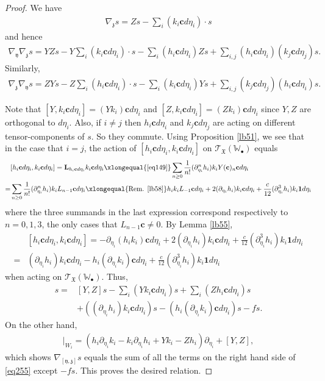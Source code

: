 \documentclass[12pt,b5paper,notitlepage]{report}
\theoremstyle{definition}
\theoremstyle{plain}
\newcommand{\fk}{\mathfrak}
\newcommand{\wtd}{\widetilde}
\newcommand{\id}{\mathbf{1}}
\newcommand{\scr}{\mathscr}
\newcommand{\yk}{\mathfrak y}
\newcommand{\zk}{\mathfrak z}
\newcommand{\mbf}{\mathbf}
\newcommand{\blt}{\bullet}
\newcommand{\Wbb}{\mathbb W}
\newcommand{\cbf}{\mathbf c}
\numberwithin{equation}{section}
\begin{document}
\begin{proof}
We have
\begin{align*}
\nabla_\zk s=Zs-\sum_i (k_i\cbf d\eta_i)\cdot s
\end{align*}
and hence
\begin{align*}
\nabla_\yk\nabla_\zk s=YZs-Y\sum_i (k_i\cbf d\eta_i)\cdot s-\sum_i(h_i\cbf d\eta_i) Zs+\sum_{i,j} (h_i\cbf d\eta_i)(k_j\cbf d\eta_j) s.
\end{align*}
Similarly,
\begin{align*}
\nabla_\zk\nabla_\yk s=ZYs-Z\sum_i (h_i\cbf d\eta_i)\cdot s-\sum_i(k_i\cbf d\eta_i) Ys+\sum_{i,j} (k_j\cbf d\eta_j)(h_i\cbf d\eta_i) s.
\end{align*}

Note that $[Y,k_i\cbf d\eta_i]=(Yk_i)\cbf d\eta_i$ and $[Z,k_i\cbf d\eta_i]=(Zk_i)\cbf d\eta_i$ since $Y,Z$ are orthogonal to $d\eta_i$. Also, if $i\neq j$ then $h_i\cbf d\eta_i$ and $k_j\cbf d\eta_j$ are acting on different tensor-components of $s$. So they commute. Using Proposition \ref{lb51}, we see that in the case that $i=j$, the action of $[h_i\cbf d\eta_i,k_i\cbf d\eta_i]$ on $\scr T_{\fk X}(\Wbb_\blt)$ equals
\begin{align*}
&[h_i\cbf d\eta_i,k_i\cbf d\eta_i]=\mbf L_{h_i\cbf d\eta_i}k_i\cbf d\eta_i \xlongequal{\eqref{eq149}} \sum_{n\geq 0}\frac 1{n!}(\partial_{\eta_i}^nh_i)k_i Y(\cbf)_n\cbf d\eta_i\\
=&\sum_{n\geq 0}\frac 1{n!}(\partial_{\eta_i}^nh_i) k_i L_{n-1}\cbf d\eta_i \xlongequal{\text{Rem. }\ref{lb58}} h_ik_i L_{-1}\cbf d\eta_i+ 2(\partial_{\eta_i}h_i)k_i\cbf d\eta_i+\frac c{12} (\partial_{\eta_i}^3h_i)k_i\id d\eta_i
\end{align*}
where the three summands in the last expression correspond respectively to $n=0,1,3$, the only cases that $L_{n-1}\cbf\neq 0$. By Lemma \ref{lb55}, 
\begin{align*}
&[h_i\cbf d\eta_i,k_i\cbf d\eta_i]=-\partial_{\eta_i}(h_ik_i) \cbf d\eta_i+ 2(\partial_{\eta_i}h_i)k_i\cbf d\eta_i+\frac c{12} (\partial_{\eta_i}^3h_i)k_i\id d\eta_i\\
=&(\partial_{\eta_i}h_i)k_i\cbf d\eta_i-h_i(\partial_{\eta_i}k_i)\cbf d\eta_i+\frac c{12} (\partial_{\eta_i}^3h_i)k_i\id d\eta_i
\end{align*}
when acting on $\scr T_{\fk X}(\Wbb_\blt)$. Thus, 
\begin{align}
[\nabla_\yk,\nabla_\zk]s=&[Y,Z]s-\sum_i (Yk_i\cbf d\eta_i) s+\sum_i(Zh_i\cbf d\eta_i) s\nonumber\\
&+((\partial_{\eta_i}h_i)k_i\cbf d\eta_i)s-(h_i(\partial_{\eta_i}k_i)\cbf d\eta_i)s-fs.\label{eq255}
\end{align}
On the other hand,
\begin{align*}
[\wtd\yk,\wtd\zk]|_{W_i}=(h_i\partial_{\eta_i}k_i-k_i\partial_{\eta_i}h_i+Yk_i-Zh_i)\partial_{\eta_i}+[Y,Z],
\end{align*}
which shows $\nabla_{[\yk,\zk]}s$ equals the sum of all the terms on the right hand side of \eqref{eq255} except $-fs$. This proves the desired relation.
\end{proof}
\end{document}
